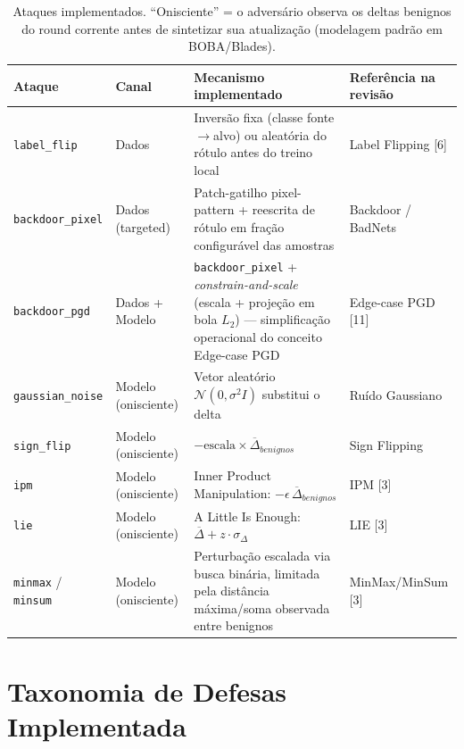 \documentclass[11pt,a4paper]{article}
\begin{document}
\begin{table}[htbp]
\centering
\fontsize{8}{10}\selectfont
\begin{tabular}{p{2.6cm}p{2.2cm}p{6.5cm}p{3.3cm}}
\toprule
\textbf{Ataque} & \textbf{Canal} & \textbf{Mecanismo implementado} & \textbf{Referência na revisão} \\
\midrule
\rowcolor{lightbg} \texttt{label\_flip} & Dados & Inversão fixa (classe fonte$\to$alvo) ou aleatória do rótulo antes do treino local & Label Flipping [6] \\
\texttt{backdoor\_pixel} & Dados (targeted) & Patch-gatilho pixel-pattern + reescrita de rótulo em fração configurável das amostras & Backdoor / BadNets \\
\rowcolor{lightbg} \texttt{backdoor\_pgd} & Dados + Modelo & \texttt{backdoor\_pixel} + \textit{constrain-and-scale} (escala + projeção em bola $L_2$) — simplificação operacional do conceito Edge-case PGD & Edge-case PGD [11] \\
\texttt{gaussian\_noise} & Modelo (onisciente) & Vetor aleatório $\mathcal{N}(0,\sigma^2 I)$ substitui o delta & Ruído Gaussiano \\
\rowcolor{lightbg} \texttt{sign\_flip} & Modelo (onisciente) & $-\text{escala}\times \overline{\Delta}_{benignos}$ & Sign Flipping \\
\texttt{ipm} & Modelo (onisciente) & Inner Product Manipulation: $-\epsilon\,\overline{\Delta}_{benignos}$ & IPM [3] \\
\rowcolor{lightbg} \texttt{lie} & Modelo (onisciente) & A Little Is Enough: $\overline{\Delta} + z\cdot\sigma_{\Delta}$ & LIE [3] \\
\texttt{minmax} / \texttt{minsum} & Modelo (onisciente) & Perturbação escalada via busca binária, limitada pela distância máxima/soma observada entre benignos & MinMax/MinSum [3] \\
\bottomrule
\end{tabular}
\caption{Ataques implementados. ``Onisciente'' = o adversário observa os deltas benignos do round corrente antes de sintetizar sua atualização (modelagem padrão em BOBA/Blades).}
\end{table}

\section{Taxonomia de Defesas Implementada}
\end{document}
